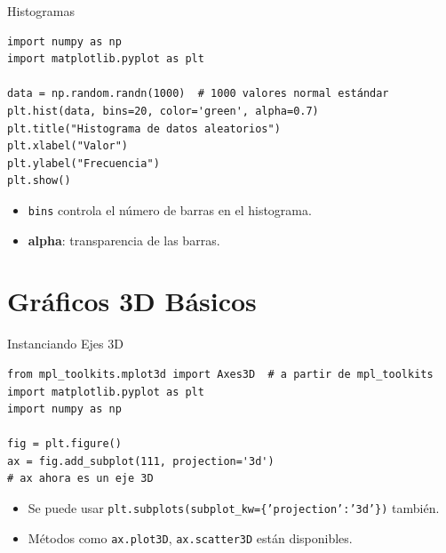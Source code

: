 \documentclass[10pt]{beamer}
\begin{document}
\begin{frame}[fragile]{Histogramas}
\begin{verbatim}
import numpy as np
import matplotlib.pyplot as plt

data = np.random.randn(1000)  # 1000 valores normal estándar
plt.hist(data, bins=20, color='green', alpha=0.7)
plt.title("Histograma de datos aleatorios")
plt.xlabel("Valor")
plt.ylabel("Frecuencia")
plt.show()
\end{verbatim}
\begin{itemize}
  \item \texttt{bins} controla el número de barras en el histograma.
  \item \textbf{alpha}: transparencia de las barras.
\end{itemize}
\end{frame}

\section{Gráficos 3D Básicos}

\begin{frame}[fragile]{Instanciando Ejes 3D}
\begin{verbatim}
from mpl_toolkits.mplot3d import Axes3D  # a partir de mpl_toolkits
import matplotlib.pyplot as plt
import numpy as np

fig = plt.figure()
ax = fig.add_subplot(111, projection='3d')
# ax ahora es un eje 3D
\end{verbatim}
\begin{itemize}
  \item Se puede usar \texttt{plt.subplots(subplot\_kw=\{'projection':'3d'\})} también.
  \item Métodos como \texttt{ax.plot3D}, \texttt{ax.scatter3D} están disponibles.
\end{itemize}
\end{frame}
\end{document}
